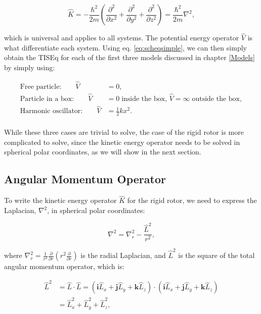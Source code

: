 \documentclass[
  9pt,
]{extbook}
\theoremstyle{definition}
\theoremstyle{definition}
\theoremstyle{definition}
\theoremstyle{remark}
\begin{document}
\begin{equation}
\hat{K}=- \frac{\hbar^2}{2m} \left(\frac{\partial^2}{\partial x^2} + \frac{\partial^2}{\partial y^2} + \frac{\partial^2}{\partial z^2} \right) = \frac{\hbar^2}{2m} \nabla^2,
\label{eq:hamilt2}  
\end{equation}

which is universal and applies to all systems. The potential energy operator \(\hat{V}\) is what differentiate each system. Using eq. \eqref{eq:scheqsimple}, we can then simply obtain the TISEq for each of the first three models discussed in chapter \ref{Models} by simply using:

\begin{equation}
\begin{aligned}
\text{Free particle:}\qquad \hat{V} &= 0, \\
\text{Particle in a box:}\qquad \hat{V} &= 0 \; \text{inside the box, } \hat{V} = \infty \; \text{outside the box},\\
\text{Harmonic oscillator:}\qquad \hat{V} &= \frac{1}{2}kx^2. \\
\end{aligned}
\label{eq:hamilt3}  
\end{equation}

While these three cases are trivial to solve, the case of the rigid rotor is more complicated to solve, since the kinetic energy operator needs to be solved in spherical polar coordinates, as we will show in the next section.

\hypertarget{angular-momentum-operator}{%
\subsection{Angular Momentum Operator}\label{angular-momentum-operator}}

To write the kinetic energy operator \(\hat{K}\) for the rigid rotor, we need to express the Laplacian, \(\nabla^2\), in spherical polar coordinates:

\begin{equation}
\nabla^2=\nabla^2_r - \frac{\hat{L}^2}{r^2},
\label{eq:angmom1}  
\end{equation}

where \(\nabla_r^2 = \frac{1}{r^2}\frac{\partial}{\partial r} \left( r^2\frac{\partial}{\partial r} \right)\) is the radial Laplacian, and \(\hat{L}^2\) is the square of the total angular momentum operator, which is:

\begin{equation}
\begin{aligned}
\hat{L}^2 &=\hat{L}\cdot\hat{L}=\left(\mathbf{i}\hat{L}_x+\mathbf{j}\hat{L}_y+\mathbf{k}\hat{L}_z\right)\cdot\left(\mathbf{i}\hat{L}_x+\mathbf{j}\hat{L}_y+\mathbf{k}\hat{L}_z \right) \\
&=\hat{L}_x^2+\hat{L}_y^2+\hat{L}_z^2,
\end{aligned}
\label{eq:angmom1b}    
\end{equation}
\end{document}
